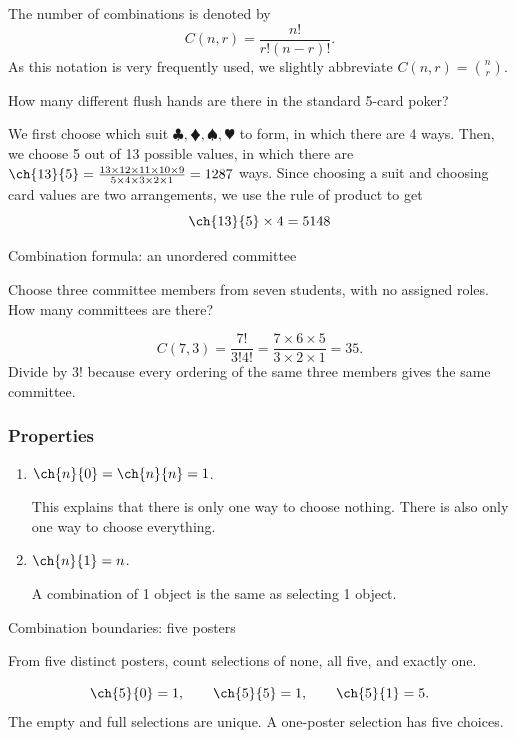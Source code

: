 \begin{frame}
\begin{thm}{}{}
The number of combinations is denoted by
\[ C(n,r) = \frac{n!}{r! (n-r)!}.\]
As this notation is very frequently used, we slightly abbreviate $C(n,r) = { n \choose r}$.
\end{thm}
\end{frame}


\begin{frame}[t]
\begin{ex}
How many different flush hands are there in the standard 5-card poker?
\end{ex}
\begin{sol}
We first choose which suit $\clubsuit, \vardiamondsuit, \spadesuit, \varheartsuit$ to form, in which there are 4 ways. Then, we choose 5 out of 13 possible values, in which there are $\ch{13}{5} = \frac{13 \times 12 \times 11 \times 10 \times 9}{5 \times 4 \times 3 \times 2 \times 1} = 1287$ ways. Since choosing a suit and choosing card values are two arrangements, we use the rule of product to get
\[ \ch{13}{5} \times 4 = 5148\]
\end{sol}
\end{frame}
\begin{frame}[t]{Combination formula: an unordered committee}
\small
\begin{ex}
Choose three committee members from seven students, with no assigned roles. How many committees are there?
\end{ex}
\begin{sol}
\[C(7,3)=\frac{7!}{3!4!}=\frac{7\times6\times5}{3\times2\times1}=35.\] Divide by $3!$ because every ordering of the same three members gives the same committee.
\end{sol}
\end{frame}


\begin{frame}
\frametitle{Properties}
\begin{prop}{}{}
\begin{enumerate}
\item $\ch{n}{0} = \ch{n}{n} = 1$. \begin{slide}This explains that there is only one way to choose nothing. There is also only one way to choose everything.\end{slide}
\item $\ch{n}{1} = n$. \begin{slide}A combination of 1 object is the same as selecting 1 object.\end{slide}
\end{enumerate}
\end{prop}
\end{frame}
\begin{frame}[t]{Combination boundaries: five posters}
\small
\begin{ex}
From five distinct posters, count selections of none, all five, and exactly one.
\end{ex}
\begin{sol}
\[\ch{5}{0}=1,\qquad\ch{5}{5}=1,\qquad\ch{5}{1}=5.\] The empty and full selections are unique. A one-poster selection has five choices.
\end{sol}
\end{frame}

